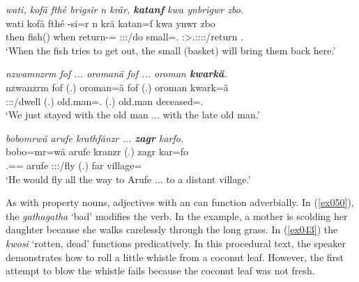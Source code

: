 \begin{exe}
	\ex \emph{wati, kofä fthé brigsir n krär, \textbf{katanf} kwa ynbrigwr zbo.}\\
	\gll wati kofä fthé -si=r n krä katan=f kwa ynwr zbo\\
	then fish(\Abs{}) when return-\Nmlz=\Purp{} \Imn{} \Stsg:\Sbj:\Irr:\Pfv/do small=\Erg.\Sg{} \Fut{} \Stsg:\Sbj>\Tsg.\Masc:\Obj:\Nonpast:\Ipfv:\Venit/return \Prox{}.\All{}\\
	\trans `When the fish tries to get out, the small (basket) will bring them back here.' 
	\label{ex048}
\end{exe}
\begin{exe}
	\ex \emph{nzwamnzrm fof ... oromanä fof ... oroman \textbf{kwarkä}.}\\
	\gll nzwanzrm fof (.) oroman=ä fof (.) oroman kwark=ä\\
	\Fsg:\Sbj:\Pst:\Dur/dwell \Emph{} (.) {old.man=\Assoc.\Pl} \Emph{} (.) {old.man} deceased=\Assoc.\Pl{}\\
	\trans `We just stayed with the old man ... with the late old man.'\\ 
	\label{ex049}
\end{exe}
\begin{exe}
	\ex \emph{bobomrwä arufe krathfänzr ... \textbf{zagr} karfo.}\\
	\gll bobo=mr=wä arufe kranzr (.) zagr kar=fo\\
	\Med.\All=\Purp=\Emph{} arufe \Stsg:\Sbj:\Irr:\Ipfv/fly (.) far village=\All\\
	\trans `He would fly all the way to Arufe ... to a distant village.'\\ 
	\label{ex505}
\end{exe}

As with property nouns, adjectives with an   can function adverbially. In (\ref{ex050}), the  \emph{gathagatha} `bad' modifies the verb. In the example, a mother is scolding her daughter because she walks carelessly through the long grass. In (\ref{ex043}) the  \emph{kwosi} `rotten, dead' functions predicatively. In this procedural text, the speaker demonstrates how to roll a little whistle from a coconut leaf. However, the first attempt to blow the whistle fails because the coconut leaf was not fresh.

